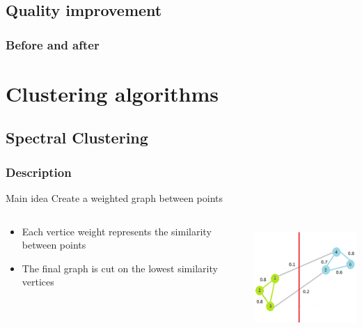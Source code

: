 \documentclass[10p]{beamer}
\begin{document}
\subsection{Quality improvement}
\begin{frame}[allowframebreaks]
\frametitle{Before and after}
\end{frame}
\section{Clustering algorithms}
\subsection{Spectral Clustering}
\begin{frame}
\frametitle{Description}
\begin{block}{Main idea}
Create a weighted graph between points
\end{block}
\vfill
\begin{columns}
\begin{column}{0.6\textwidth}
\begin{itemize}
\item Each vertice weight represents the similarity between points
\item The final graph is cut on the lowest similarity vertices
\end{itemize}
\end{column}
\begin{column}{0.4\textwidth}
\includegraphics[width=\columnwidth, height=4cm]{Image/graph.png}
\end{column}
\end{columns}
\end{frame}
\end{document}
